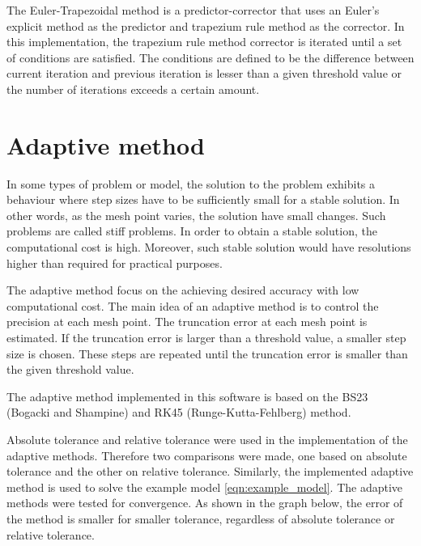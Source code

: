 The Euler-Trapezoidal method is a predictor-corrector that uses an Euler's explicit method as the predictor and trapezium rule method as the corrector. In this implementation, the trapezium rule method corrector is iterated until a set of conditions are satisfied. The conditions are defined to be the difference between current iteration and previous iteration is lesser than a given threshold value or the number of iterations exceeds a certain amount. 


\section{Adaptive method}
In some types of problem or model, the solution to the problem exhibits a behaviour where step sizes have to be sufficiently small for a stable solution. In other words, as the mesh point varies, the solution have small changes. Such problems are called stiff problems. In order to obtain a stable solution, the computational cost is high. Moreover, such stable solution would have resolutions higher than required for practical purposes.

The adaptive method focus on the achieving desired accuracy with low computational cost. The main idea of an adaptive method is to control the precision at each mesh point. The truncation error at each mesh point is estimated. If the truncation error is larger than a threshold value, a smaller step size is chosen. These steps are repeated until the truncation error is smaller than the given threshold value.

The adaptive method implemented in this software is based on the BS23 (Bogacki and Shampine) and RK45 (Runge-Kutta-Fehlberg) method. 


Absolute tolerance and relative tolerance were used in the implementation of the adaptive methods. Therefore two comparisons were made, one based on absolute tolerance and the other on relative tolerance. Similarly, the implemented adaptive method is used to solve the example model \ref{eqn:example_model}. The adaptive methods were tested for convergence. As shown in the graph below, the error of the method is smaller for smaller tolerance, regardless of absolute tolerance or relative tolerance.

